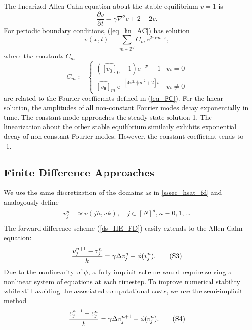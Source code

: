 \documentclass[12pt, reqno]{report}
\theoremstyle{definition}
\theoremstyle{remark}
\newcommand{\e}{\mathrm{e}}
\renewcommand{\i}{\mathrm{i}}
\begin{document}
    
The linearized Allen-Cahn equation about the stable equilibrium $v=1$ is 
\begin{equation} \label{eq_lin_AC}
    \frac{\partial v}{\partial t}=\gamma\nabla ^{2}v+2-2v.
\end{equation}
For periodic boundary conditions, (\ref{eq_lin_AC}) has solution
\begin{equation} 
    v(x,t)=\sum_{m\in\mathbb{Z}^{d}}C_{m}~\e^{2\pi\i m\cdot x},
\end{equation}
where the constants $C_{m}$
\begin{equation}
    C_{m}:=\begin{cases}
    (\widehat{[v_{0}]}_{0}-1)\e^{-2t}+1 & m=0\\
    \widehat{[v_{0}]}_{m}~\e^{-[4\pi^{2}\gamma|m|^{2}+2]t} & m\ne0
    \end{cases}
\end{equation}
are related to the Fourier coefficients defined in (\ref{eq_FC}).
For the linear solution, the amplitudes of all non-constant Fourier modes decay exponentially in time. 
The constant mode approaches the steady state solution 1. 
The linearization about the other stable equilibrium similarly exhibits exponential decay of non-constant Fourier modes. 
However, the constant coefficient tends to -1.




\subsection{Finite Difference Approaches} \label{ssec_AC_FD}

We use the same discretization of the domains as in \ref{sssec_heat_fd} and analogously define 
\begin{align*}
	v_j^n&\approx v(jh,nk),\quad j\in[N]^d,n=0,1,\ldots\\
\end{align*}
The forward difference scheme (\ref{ds_HE_FD}) easily extends to the Allen-Cahn equation:
\begin{equation} \label{ds_AC_FD}
	\frac{v_j^{n+1}-v_j^n}{k}=\gamma\Delta v_j^n-\phi(v_j^n).{\tag{S3}}
\end{equation}
Due to the nonlinearity of $\phi$, a fully implicit scheme would require solving a nonlinear system of equations at each timestep. 
To improve numerical stability while still avoiding the associated computational costs, we use the semi-implicit method
\begin{equation} \label{ds_AC_CN}
    \frac{c_j^{n+1}-c_j^n}{k } =\gamma\Delta v_j^{n+1}-\phi(v_j^n). {\tag{S4}}
\end{equation}
\end{document}
